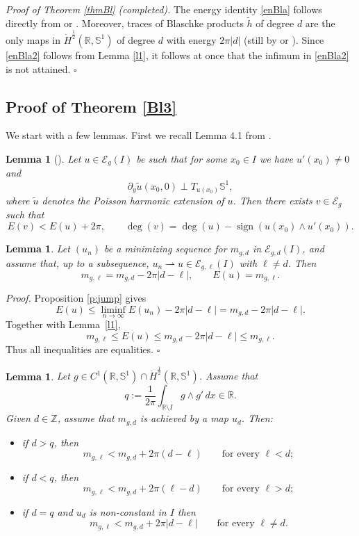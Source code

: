 \documentclass[12pt, a4paper]{article}
\newtheorem{lem}[thm]{Lemma}
\newenvironment{proof}{\noindent\emph{Proof.}}{\hfill$\square$\medskip}
\newcommand{\M}[1]{\mathcal{#1}}
\newcommand{\sph}{\mathbb{S}}
\newcommand{\R}{\mathbb{R}}
\renewcommand{\(}{\left(}
\renewcommand{\)}{\right)}
\begin{document}
\noindent\emph{Proof of Theorem \ref{thmBl} (completed).} The energy identity \eqref{enBla} follows directly from \cite[Lemma 3.1]{BMRS} or \cite[Lemma 5.1]{HM}. Moreover, traces of Blaschke products $\tilde h$ of degree $d$ are the only maps in {$\dot H^\frac12(\R,\sph^1)$ of degree $d$} with energy $2\pi |d|$ {(still by \cite[Lemma 3.1]{BMRS} or \cite[Lemma 5.1]{HM})}. { Since \eqref{enBla2} follows from Lemma \ref{l1}, it follows at once that the infimum in \eqref{enBla2} is not attained.} \hfill$\square$

\medskip

\subsection{Proof of Theorem \ref{Bl3}}

We start with a few lemmas. First we recall Lemma 4.1 from \cite{HM}.

\begin{lem}[\cite{HM}]\label{l2} Let $u\in \M E_g(I)$ be such that for some
$x_0\in I$ we have $u'(x_0)\neq 0$ and
\begin{equation}\label{perp}
\partial_y \tilde u(x_0,0)\perp T_{u(x_0)}\sph^1,
\end{equation}
where $\tilde u$ denotes the Poisson harmonic extension of $u$. Then there exists
$v\in\M E_g$ such that
\[
E(v)<E(u)+2\pi,\qquad
\deg(v)=\deg(u)-\operatorname{sign}(u(x_0)\wedge u'(x_0)).
\]
\end{lem}


\begin{lem}\label{l4} Let $(u_n)$ be a minimizing sequence for $m_{g,d}$ in
$\M E_{g,d}(I)$, and assume that, up to a subsequence,
$u_n\rightharpoonup u\in \M E_{g,\ell}(I)$ with $\ell\neq d$. Then
\[
m_{g,\ell}=m_{g,d}-2\pi|d-\ell|,
\qquad
E(u)=m_{g,\ell}.
\]
\end{lem}

\begin{proof}
Proposition \ref{p:jump} gives
\[
E(u)\le \liminf_{n\to\infty}E(u_n)-2\pi|d-\ell|
       =m_{g,d}-2\pi|d-\ell|.
\]
Together with Lemma~\ref{l1},
\[
m_{g,\ell}\le E(u)
\le m_{g,d}-2\pi|d-\ell|
\le m_{g,\ell}.
\]
Thus all inequalities are equalities.
\end{proof}


\begin{lem}\label{lem:strict-comparison}
Let $g\in C^1(\R,\sph^1)\cap \dot H^{\frac12}(\R,\sph^1)$. Assume that
\[
q:=\frac1{2\pi}\int_{\R\setminus I} g\wedge g'\,dx\in \R.
\]
Given $d\in \mathbb{Z}$, assume that $m_{g,d}$ is achieved by a map $u_d$. Then:
\begin{itemize}
\item if $d>q$, then
\[
m_{g,\ell}<m_{g,d}+2\pi(d-\ell)\qquad\text{for every }\ell<d;
\]
\item if $d<q$, then
\[
m_{g,\ell}<m_{g,d}+2\pi(\ell-d)\qquad\text{for every }\ell>d;
\]
\item if $d=q$ and $u_d$ is non-constant in $I$  then 
\[
m_{g,\ell}<m_{g,d}+2\pi|d-\ell|
\qquad\text{for every }\ell\neq d.
\]
\end{itemize}
\end{lem}
\end{document}

